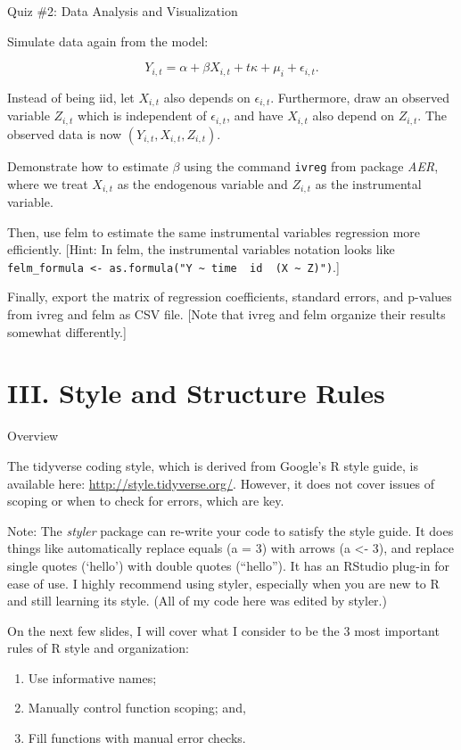 \documentclass[10pt,ignorenonframetext,]{beamer}
\providecommand{\tightlist}{%
\setlength{\itemsep}{0pt}\setlength{\parskip}{0pt}}
\begin{document}
\begin{frame}[fragile]{Quiz \#2: Data Analysis and Visualization}

Simulate data again from the model:

\[
Y_{i,t} = \alpha + \beta X_{i,t} + t\kappa  + \mu_i + \epsilon_{i,t}.
\]

Instead of being iid, let \(X_{i,t}\) also depends on
\(\epsilon_{i,t}\). Furthermore, draw an observed variable \(Z_{i,t}\)
which is independent of \(\epsilon_{i,t}\), and have \(X_{i,t}\) also
depend on \(Z_{i,t}\). The observed data is now
\((Y_{i,t},X_{i,t},Z_{i,t})\).

Demonstrate how to estimate \(\beta\) using the command \texttt{ivreg}
from package \emph{AER}, where we treat \(X_{i,t}\) as the endogenous
variable and \(Z_{i,t}\) as the instrumental variable.

Then, use felm to estimate the same instrumental variables regression
more efficiently. {[}Hint: In felm, the instrumental variables notation
looks like
\texttt{felm\_formula\ \textless{}-\ as.formula("Y\ \textasciitilde{}\ time\ \textbar{}\ id\ \textbar{}\ (X\ \textasciitilde{}\ Z)")}.{]}

Finally, export the matrix of regression coefficients, standard errors,
and p-values from ivreg and felm as CSV file. {[}Note that ivreg and
felm organize their results somewhat differently.{]}

\end{frame}

\section{III. Style and Structure
Rules}\label{iii.-style-and-structure-rules}

\begin{frame}{Overview}

The tidyverse coding style, which is derived from Google's R style
guide, is available here: \url{http://style.tidyverse.org/}. However, it
does not cover issues of scoping or when to check for errors, which are
key.

Note: The \emph{styler} package can re-write your code to satisfy the
style guide. It does things like automatically replace equals (a = 3)
with arrows (a \textless{}- 3), and replace single quotes (`hello') with
double quotes (``hello''). It has an RStudio plug-in for ease of use. I
highly recommend using styler, especially when you are new to R and
still learning its style. (All of my code here was edited by styler.)

On the next few slides, I will cover what I consider to be the 3 most
important rules of R style and organization:

\begin{enumerate}
\def\labelenumi{\arabic{enumi}.}
\tightlist
\item
  Use informative names;
\item
  Manually control function scoping; and,
\item
  Fill functions with manual error checks.
\end{enumerate}

\end{frame}
\end{document}
